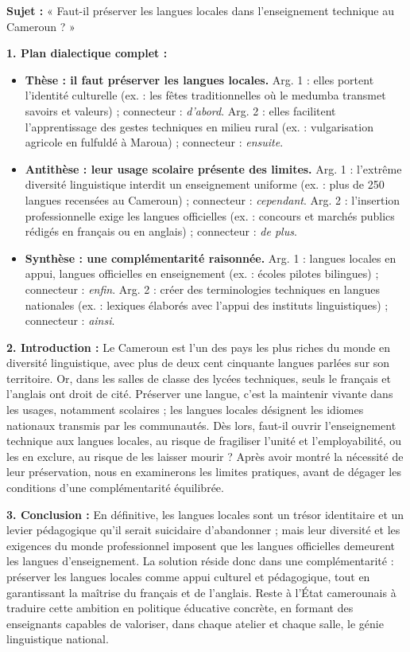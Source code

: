 \documentclass[11pt]{article}
\begin{document}
\begin{corrige}
\textbf{Sujet :} « Faut-il préserver les langues locales dans l'enseignement technique au Cameroun ? »

\textbf{1. Plan dialectique complet :}
\begin{itemize}
\item \textbf{Thèse : il faut préserver les langues locales.} Arg. 1 : elles portent l'identité culturelle (ex. : les fêtes traditionnelles où le medumba transmet savoirs et valeurs) ; connecteur : \emph{d'abord}. Arg. 2 : elles facilitent l'apprentissage des gestes techniques en milieu rural (ex. : vulgarisation agricole en fulfuldé à Maroua) ; connecteur : \emph{ensuite}.
\item \textbf{Antithèse : leur usage scolaire présente des limites.} Arg. 1 : l'extrême diversité linguistique interdit un enseignement uniforme (ex. : plus de 250 langues recensées au Cameroun) ; connecteur : \emph{cependant}. Arg. 2 : l'insertion professionnelle exige les langues officielles (ex. : concours et marchés publics rédigés en français ou en anglais) ; connecteur : \emph{de plus}.
\item \textbf{Synthèse : une complémentarité raisonnée.} Arg. 1 : langues locales en appui, langues officielles en enseignement (ex. : écoles pilotes bilingues) ; connecteur : \emph{enfin}. Arg. 2 : créer des terminologies techniques en langues nationales (ex. : lexiques élaborés avec l'appui des instituts linguistiques) ; connecteur : \emph{ainsi}.
\end{itemize}

\textbf{2. Introduction :} Le Cameroun est l'un des pays les plus riches du monde en diversité linguistique, avec plus de deux cent cinquante langues parlées sur son territoire. Or, dans les salles de classe des lycées techniques, seuls le français et l'anglais ont droit de cité. Préserver une langue, c'est la maintenir vivante dans les usages, notamment scolaires ; les langues locales désignent les idiomes nationaux transmis par les communautés. Dès lors, faut-il ouvrir l'enseignement technique aux langues locales, au risque de fragiliser l'unité et l'employabilité, ou les en exclure, au risque de les laisser mourir ? Après avoir montré la nécessité de leur préservation, nous en examinerons les limites pratiques, avant de dégager les conditions d'une complémentarité équilibrée.

\textbf{3. Conclusion :} En définitive, les langues locales sont un trésor identitaire et un levier pédagogique qu'il serait suicidaire d'abandonner ; mais leur diversité et les exigences du monde professionnel imposent que les langues officielles demeurent les langues d'enseignement. La solution réside donc dans une complémentarité : préserver les langues locales comme appui culturel et pédagogique, tout en garantissant la maîtrise du français et de l'anglais. Reste à l'État camerounais à traduire cette ambition en politique éducative concrète, en formant des enseignants capables de valoriser, dans chaque atelier et chaque salle, le génie linguistique national.


\end{corrige}
\end{document}
